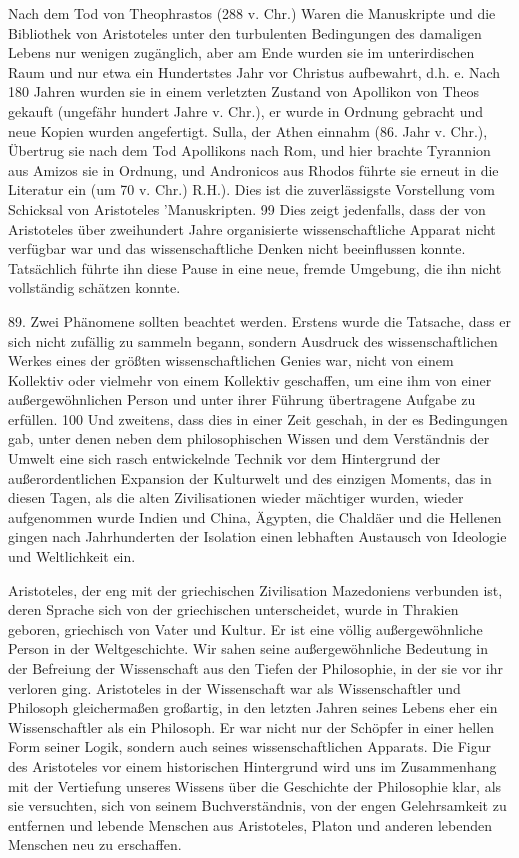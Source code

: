 \documentclass[11pt,a4paper]{book}
\begin{document}
Nach dem Tod von Theophrastos (288 v. Chr.) Waren die Manuskripte und die Bibliothek von Aristoteles unter den turbulenten Bedingungen des damaligen Lebens nur wenigen zugänglich, aber am Ende wurden sie im unterirdischen Raum und nur etwa ein Hundertstes Jahr vor Christus aufbewahrt, d.h. e. Nach 180 Jahren wurden sie in einem verletzten Zustand von Apollikon von Theos gekauft (ungefähr hundert Jahre v. Chr.), er wurde in Ordnung gebracht und neue Kopien wurden angefertigt. Sulla, der Athen einnahm (86. Jahr v. Chr.), Übertrug sie nach dem Tod Apollikons nach Rom, und hier brachte Tyrannion aus Amizos sie in Ordnung, und Andronicos aus Rhodos führte sie erneut in die Literatur ein (um 70 v. Chr.) R.H.). Dies ist die zuverlässigste Vorstellung vom Schicksal von Aristoteles 'Manuskripten. 99 Dies zeigt jedenfalls, dass der von Aristoteles über zweihundert Jahre organisierte wissenschaftliche Apparat nicht verfügbar war und das wissenschaftliche Denken nicht beeinflussen konnte. Tatsächlich führte ihn diese Pause in eine neue, fremde Umgebung, die ihn nicht vollständig schätzen konnte.



89. Zwei Phänomene sollten beachtet werden. Erstens wurde die Tatsache, dass er sich nicht zufällig zu sammeln begann, sondern Ausdruck des wissenschaftlichen Werkes eines der größten wissenschaftlichen Genies war, nicht von einem Kollektiv oder vielmehr von einem Kollektiv geschaffen, um eine ihm von einer außergewöhnlichen Person und unter ihrer Führung übertragene Aufgabe zu erfüllen. 100 Und zweitens, dass dies in einer Zeit geschah, in der es Bedingungen gab, unter denen neben dem philosophischen Wissen und dem Verständnis der Umwelt eine sich rasch entwickelnde Technik vor dem Hintergrund der außerordentlichen Expansion der Kulturwelt und des einzigen Moments, das in diesen Tagen, als die alten Zivilisationen wieder mächtiger wurden, wieder aufgenommen wurde Indien und China, Ägypten, die Chaldäer und die Hellenen gingen nach Jahrhunderten der Isolation einen lebhaften Austausch von Ideologie und Weltlichkeit ein.



Aristoteles, der eng mit der griechischen Zivilisation Mazedoniens verbunden ist, deren Sprache sich von der griechischen unterscheidet, wurde in Thrakien geboren, griechisch von Vater und Kultur. Er ist eine völlig außergewöhnliche Person in der Weltgeschichte. Wir sahen seine außergewöhnliche Bedeutung in der Befreiung der Wissenschaft aus den Tiefen der Philosophie, in der sie vor ihr verloren ging. Aristoteles in der Wissenschaft war als Wissenschaftler und Philosoph gleichermaßen großartig, in den letzten Jahren seines Lebens eher ein Wissenschaftler als ein Philosoph. Er war nicht nur der Schöpfer in einer hellen Form seiner Logik, sondern auch seines wissenschaftlichen Apparats. Die Figur des Aristoteles vor einem historischen Hintergrund wird uns im Zusammenhang mit der Vertiefung unseres Wissens über die Geschichte der Philosophie klar, als sie versuchten, sich von seinem Buchverständnis, von der engen Gelehrsamkeit zu entfernen und lebende Menschen aus Aristoteles, Platon und anderen lebenden Menschen neu zu erschaffen.
\end{document}

